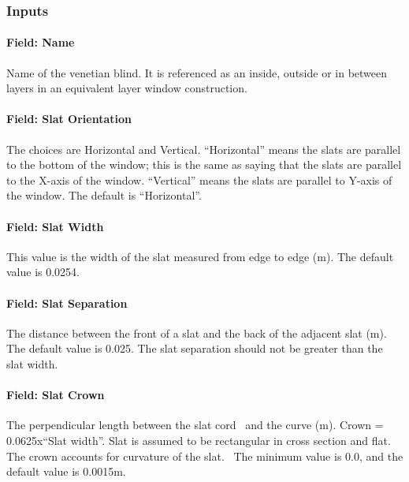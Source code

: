 \subsubsection{Inputs}\label{inputs-28-001}

\paragraph{Field: Name}\label{field-name-22-003}

Name of the venetian blind. It is referenced as an inside, outside or in between layers in an equivalent layer window construction.

\paragraph{Field: Slat Orientation}\label{field-slat-orientation-1}

The choices are Horizontal and Vertical. ``Horizontal'' means the slats are parallel to the bottom of the window; this is the same as saying that the slats are parallel to the X-axis of the window. ``Vertical'' means the slats are parallel to Y-axis of the window. The default is ``Horizontal''.

\paragraph{Field: Slat Width}\label{field-slat-width-2}

This value is the width of the slat measured from edge to edge (m). The default value is 0.0254.

\paragraph{Field: Slat Separation}\label{field-slat-separation-1}

The distance between the front of a slat and the back of the adjacent slat (m). The default value is 0.025. The slat separation should not be greater than the slat width.

\paragraph{Field: Slat Crown}\label{field-slat-crown}

The perpendicular length between the slat cord ~and the curve (m). Crown = 0.0625x``Slat width''. Slat is assumed to be rectangular in cross section and flat. The crown accounts for curvature of the slat.~ The minimum value is 0.0, and the default value is 0.0015m.

